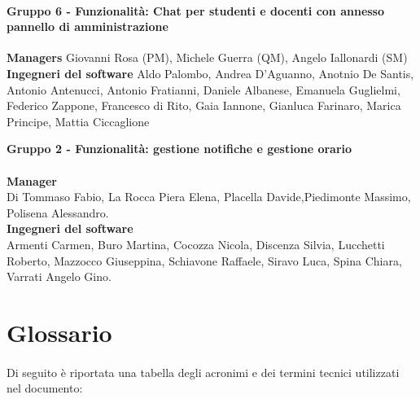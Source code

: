 \paragraph{Gruppo 6 - Funzionalità: Chat per studenti e docenti con annesso pannello di amministrazione\newline\newline} 
\textbf{Managers\newline} 
Giovanni Rosa (PM),
Michele Guerra (QM),
Angelo Iallonardi (SM)
\textbf{Ingegneri del software\newline}
Aldo Palombo,
Andrea D'Aguanno,
Anotnio De Santis,
Antonio Antenucci,
Antonio Fratianni,
Daniele Albanese,
Emanuela Guglielmi,
Federico Zappone,
Francesco di Rito,
Gaia Iannone,
Gianluca Farinaro, 
Marica Principe, 
Mattia Ciccaglione

\textbf {Gruppo 2 - Funzionalità: gestione notifiche e gestione orario} \\ \\
\textbf{Manager} \\
Di Tommaso Fabio, La Rocca Piera Elena, Placella Davide,Piedimonte Massimo, Polisena Alessandro. \\
\textbf{Ingegneri del software} \\
Armenti Carmen, Buro Martina, Cocozza Nicola, Discenza Silvia, Lucchetti Roberto, Mazzocco Giuseppina, Schiavone Raffaele, Siravo Luca, Spina Chiara, Varrati Angelo Gino.

\section{Glossario}

\paragraph{}
Di seguito è riportata una tabella degli acronimi e dei termini tecnici utilizzati nel documento:

